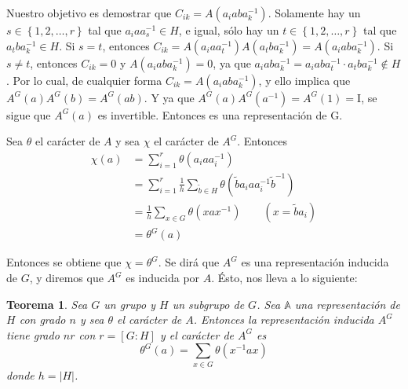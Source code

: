 \documentclass[12pt]{book}
\newtheorem{theorem}{Teorema}[section]
\theoremstyle{definition}
\newcounter{in}
\begin{document}
Nuestro objetivo es demostrar que $C_{ik}= A(a_{i} ab
a_{k}^{-1})$. Solamente hay un $s \in \left\{1, 2, \ldots, r \right\}$
tal que $a_{i} a a_{s}^{-1} \in H$, e igual, sólo hay un
$t \in \left\{1, 2, \ldots, r \right\}$ tal que
$a_{t} b a_{k}^{-1} \in H$. Si $s=t$, entonces
$C_{ik}=A(a_{i} a a_{t}^{-1}) A(a_{t} b a_{k}^{-1})=A(a_{i} ab
a_{k}^{-1})$. Si $s \neq t$, entonces $C_{ik}=0$ y
$A(a_{i} ab a_{k}^{-1}) = 0$, ya que
$a_{i} ab a_{k}^{-1} = a_{i} ab a_{t}^{-1} \cdot a_{t} b a_{k}^{-1}
\notin H$ . Por lo cual, de cualquier forma
$C_{ik} = A(a_{i} ab a_{k}^{-1})$, y ello implica que
$A^{G}(a)A^{G}(b)=A^{G}(ab)$. Y ya que
$A^{G}(a)A^{G}(a^{-1})=A^{G}(1)=\mathrm{I}$, se sigue que $A^{G}(a)$
es invertible. Entonces es una representación de G.

Sea $\theta$ el carácter de $A$ y sea $\chi$ el carácter de
$A^{G}$. Entonces
\begin{equation}
  \label{eq:64}
  \begin{aligned}
    \chi(a) &= \sum_{i=1}^{r} \theta(a_{i} a a_{i}^{-1}) \\
    & = \sum_{i=1}^{r} \frac{1}{h} \sum_{\tilde{b} \in H} \theta(\tilde{b} a_{i} a a_{i}^{-1} \tilde{b}^{-1})\\
    &= \frac{1}{h} \sum_{x \in G} \theta(x a x^{-1}) \qquad (x=\tilde{b}a_{i})\\
    &= \theta^{G}(a)
  \end{aligned}
\end{equation}

Entonces se obtiene que $\chi=\theta^{G}$. Se dirá que $A^{G}$ es una
representación inducida de $G$, y diremos que $A^{G}$ es inducida por
$A$. Ésto, nos lleva a lo siguiente:

\begin{theorem}
  \label{t5_2}
  Sea $G$ un grupo y $H$ un subgrupo de $G$. Sea $\mathbb{A}$ una
  representación de $H$ con grado $n$ y sea $\theta$ el carácter de
  $A$. Entonces la representación inducida $A^{G}$ tiene grado $nr$
  con $r=[G:H]$ y el carácter de $A^{G}$ es
  \begin{equation*}
    \theta^{G}(a)= \sum_{x \in G} \theta(x^{-1} a x)
  \end{equation*}
  donde $h= |H|$.
\end{theorem}
\end{document}
